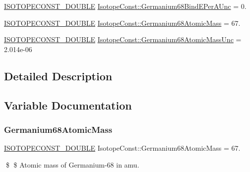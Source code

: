 \begin{DoxyCompactItemize}
\mbox{\hyperlink{group___isotope_const-_macros_ga8f45a7272ce02c0b4c65c44636ed719a}{I\+S\+O\+T\+O\+P\+E\+C\+O\+N\+S\+T\+\_\+\+D\+O\+U\+B\+LE}} \mbox{\hyperlink{group___isotope_const-_germanium-_ge68_gae6683facdb27ccbb2b6166e491ffa1b5}{Isotope\+Const\+::\+Germanium68\+Bind\+E\+Per\+A\+Unc}} = 0.
\item 
\mbox{\hyperlink{group___isotope_const-_macros_ga8f45a7272ce02c0b4c65c44636ed719a}{I\+S\+O\+T\+O\+P\+E\+C\+O\+N\+S\+T\+\_\+\+D\+O\+U\+B\+LE}} \mbox{\hyperlink{group___isotope_const-_germanium-_ge68_gaedc69c2e55a3f1b5df00e198c725ed30}{Isotope\+Const\+::\+Germanium68\+Atomic\+Mass}} = 67.
\item 
\mbox{\hyperlink{group___isotope_const-_macros_ga8f45a7272ce02c0b4c65c44636ed719a}{I\+S\+O\+T\+O\+P\+E\+C\+O\+N\+S\+T\+\_\+\+D\+O\+U\+B\+LE}} \mbox{\hyperlink{group___isotope_const-_germanium-_ge68_ga00a431bc5fa75856e06a9592c598c822}{Isotope\+Const\+::\+Germanium68\+Atomic\+Mass\+Unc}} = 2.\+014e-\/06
\end{DoxyCompactItemize}


\subsection{Detailed Description}


\subsection{Variable Documentation}
\mbox{\label{group___isotope_const-_germanium-_ge68_gaedc69c2e55a3f1b5df00e198c725ed30}} 
\subsubsection{\texorpdfstring{Germanium68\+Atomic\+Mass}{Germanium68AtomicMass}}
{\footnotesize\ttfamily \mbox{\hyperlink{group___isotope_const-_macros_ga8f45a7272ce02c0b4c65c44636ed719a}{I\+S\+O\+T\+O\+P\+E\+C\+O\+N\+S\+T\+\_\+\+D\+O\+U\+B\+LE}} Isotope\+Const\+::\+Germanium68\+Atomic\+Mass = 67.}

\$ \$ Atomic mass of Germanium-\/68 in amu. \mbox{\label{group___isotope_const-_germanium-_ge68_ga00a431bc5fa75856e06a9592c598c822}} 
